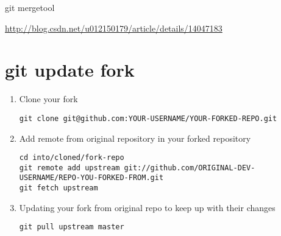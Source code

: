 \documentclass[10pt,a4paper]{article}
\begin{document}
git mergetool

\url{http://blog.csdn.net/u012150179/article/details/14047183}

\section{git update fork}

\begin{enumerate}
\item Clone your fork
\begin{lstlisting}
git clone git@github.com:YOUR-USERNAME/YOUR-FORKED-REPO.git
\end{lstlisting}

\item Add remote from original repository in your forked repository
\begin{lstlisting}
cd into/cloned/fork-repo
git remote add upstream git://github.com/ORIGINAL-DEV-USERNAME/REPO-YOU-FORKED-FROM.git
git fetch upstream
\end{lstlisting}

\item Updating your fork from original repo to keep up with their changes
\begin{lstlisting}
git pull upstream master
\end{lstlisting}
\end{enumerate}
\end{document}
